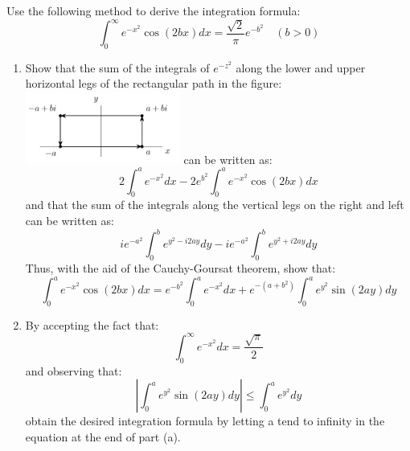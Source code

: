 \begin{problem}{1}
    Use the following method to derive the integration formula:
    \begin{equation}
        \int_{0}^{\infty} e^{-x^{2}}\cos(2bx)dx = \frac{\sqrt{2}}{\pi}e^{-b^{2}} \quad (b>0)
    \end{equation}
    \begin{enumerate}
        \item Show that the sum of the integrals of $e^{-z^{2}}$ along the lower and upper horizontal legs of the rectangular path in the figure:\\
        \includegraphics[width = 0.4\textwidth]{imgs/P1.png}\newline   
        can be written as:
        \vspace{-0.5cm}
        \begin{equation}
            2\int_{0}^{a}e^{-x^{2}} dx - 2e^{b^{2}}\int_{0}^{a}e^{-x^{2}}\cos(2bx)dx
        \end{equation}
        and that the sum of the integrals along the vertical legs on the right and left can be
written as:
        \begin{equation}
            ie^{-a^{2}}\int_{0}^{b}e^{y^{2}-i2ay}dy - ie^{-a^{2}}\int_{0}^{b}e^{y^{2}+i2ay}dy   
        \end{equation}
        Thus, with the aid of the Cauchy-Goursat theorem, show that:
        \begin{equation}
            \int_{0}^{a}e^{-x^{2}}\cos(2bx)dx = e^{-b^{2}}\int_{0}^{a}e^{-x^{2}}dx + e^{-(a+b^{2})}\int_{0}^{a}e^{y^{2}}\sin(2ay)dy
        \end{equation}

        \item By accepting the fact that:
        \begin{equation}
            \label{eq:P1-1}\int_{0}^{\infty}e^{-x^{2}}dx = \frac{\sqrt{\pi}}{2}
        \end{equation}
        and observing that:
        \begin{equation}
            \left|\int_{0}^{a}e^{y^{2}}\sin(2ay)dy\right| \leq \int_{0}^{a}e^{y^{2}}dy
        \end{equation}
        obtain the desired integration formula by letting a tend to infinity in the equation at the end of part (a).
    \end{enumerate}
\end{problem}
